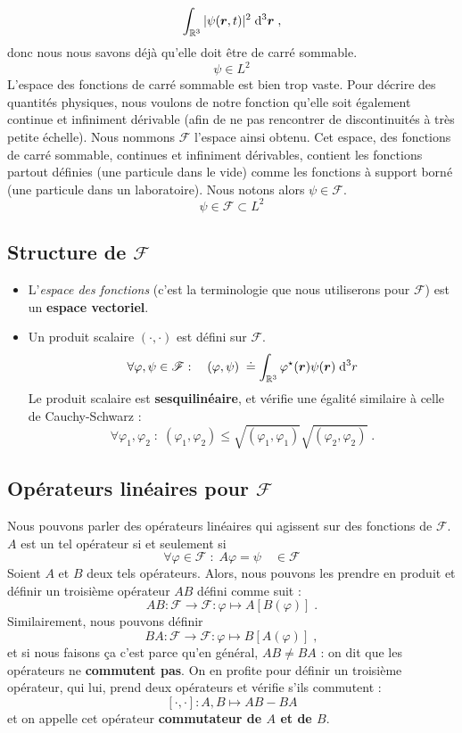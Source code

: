 \documentclass[../notesdecours.tex]{subfiles}
\begin{document}
$$ \int_{\mathbb R ^3} |\psi(\bm{r}, t)| ^2 \; \mathrm{d} ^3 \bm{r} \; ,$$
donc nous nous savons déjà qu'elle doit être de carré sommable.
$$\psi \in L^2$$
L'espace des fonctions de carré sommable est bien trop vaste. Pour décrire des quantités physiques, nous voulons de notre fonction qu'elle soit également continue et infiniment dérivable (afin de ne pas rencontrer de discontinuités à très petite échelle). Nous nommons $\mathcal F$ l'espace ainsi obtenu. Cet espace, des fonctions de carré sommable, continues et infiniment dérivables, contient les fonctions partout définies (une particule dans le vide) comme les fonctions à support borné (une particule dans un laboratoire). Nous notons alors $\psi \in \mathcal{F}$.
$$\psi \in \mathcal{F} \subset L^2$$

\subsection{Structure de $\mathcal{F}$}
\begin{itemize}
\item L'\textit{espace des fonctions} (c'est la terminologie que nous utiliserons pour $\mathcal F$) est un \textbf{espace vectoriel}. \\
\item Un produit scalaire $(\cdot, \cdot)$ est défini sur $\mathcal F$.
\begin{equation}
\forall \varphi, \psi \in \mathcal F : \quad (\varphi, \psi)\;   \doteq \int_{\mathbb R ^3} \varphi ^\star(\bm{r}) \psi(\bm{r}) \; \mathrm{d} ^3 r
\end{equation}
Le produit scalaire est \textbf{sesquilinéaire}, et vérifie une égalité similaire à celle de Cauchy-Schwarz : 
$$ \forall \varphi_1, \varphi_2 \; : \; (\varphi_1, \varphi_2) \leq \sqrt{(\varphi_1, \varphi_1)}\sqrt{(\varphi_2, \varphi_2)} \; .$$
\end{itemize}

\subsection{Opérateurs linéaires pour $\mathcal F$}
Nous pouvons parler des opérateurs linéaires qui agissent sur des fonctions de $\mathcal F$. $A$ est un tel opérateur si et seulement si $$\forall \varphi \in \mathcal F \; : \; A\varphi = \psi \quad \in 
\mathcal F$$
Soient $A$ et $B$ deux tels opérateurs. Alors, nous pouvons les prendre en produit et définir un troisième opérateur $AB$ défini comme suit :
$$AB : \mathcal F \rightarrow \mathcal F : \varphi \longmapsto A[B(\varphi)]\; .$$
Similairement, nous pouvons définir
$$BA : \mathcal F \rightarrow \mathcal F : \varphi \longmapsto B[A(\varphi)]\; ,$$
et si nous faisons ça c'est parce qu'en général, $AB \neq BA$ : on dit que les opérateurs ne \textbf{commutent pas}. On en profite pour définir un troisième opérateur, qui lui, prend deux opérateurs et vérifie s'ils commutent :
$$[\cdot, \cdot] : A, B \longmapsto AB-BA$$
et on appelle cet opérateur \textbf{commutateur de $A$ et de $B$}.
\end{document}
